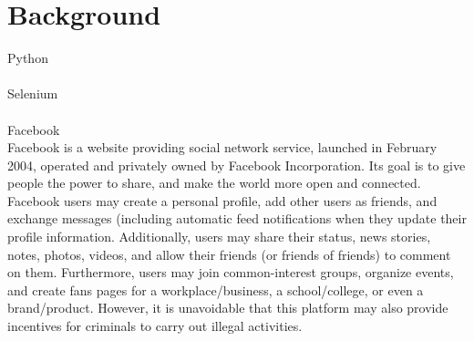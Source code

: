 

\chapter{Background}
\label{cap:background}
Python
\\\\Selenium
\\\\Facebook\\
Facebook is a website providing social network service, launched in February 2004, operated and privately owned by Facebook Incorporation. Its goal is to give people the power to share, and make the world more open and connected. Facebook users may create a personal profile, add other users as friends, and exchange messages (including automatic feed notifications when they update their profile information. Additionally, users may share their status, news stories, notes, photos, videos, and allow their friends (or friends of friends) to comment on them. Furthermore, users may join common-interest groups, organize events, and create fans pages for a workplace/business, a school/college, or even a brand/product. However, it is unavoidable that this platform may also provide incentives for criminals to carry out illegal activities.
